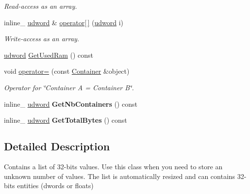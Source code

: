 \begin{DoxyCompactItemize}
\begin{DoxyCompactList}\small\item\em Read-\/access as an array. \end{DoxyCompactList}\item 
inline\+\_\+ \hyperlink{IceTypes_8h_a44c6f1920ba5551225fb534f9d1a1733}{udword} \& \hyperlink{classContainer_a8f2ac06a6c0d40eea078c108219d3cfd}{operator\mbox{[}$\,$\mbox{]}} (\hyperlink{IceTypes_8h_a44c6f1920ba5551225fb534f9d1a1733}{udword} i)\hypertarget{classContainer_a8f2ac06a6c0d40eea078c108219d3cfd}{}\label{classContainer_a8f2ac06a6c0d40eea078c108219d3cfd}

\begin{DoxyCompactList}\small\item\em Write-\/access as an array. \end{DoxyCompactList}\item 
\hyperlink{IceTypes_8h_a44c6f1920ba5551225fb534f9d1a1733}{udword} \hyperlink{classContainer_a5c3d8b367f025e179ae73aadcc620c51}{Get\+Used\+Ram} () const 
\item 
void \hyperlink{classContainer_a15a48bab360df6824d861cf3695112da}{operator=} (const \hyperlink{classContainer}{Container} \&object)\hypertarget{classContainer_a15a48bab360df6824d861cf3695112da}{}\label{classContainer_a15a48bab360df6824d861cf3695112da}

\begin{DoxyCompactList}\small\item\em Operator for \char`\"{}\+Container A = Container B\char`\"{}. \end{DoxyCompactList}\item 
inline\+\_\+ \hyperlink{IceTypes_8h_a44c6f1920ba5551225fb534f9d1a1733}{udword} {\bfseries Get\+Nb\+Containers} () const \hypertarget{classContainer_a8611d4190442ec255f7c486a2d05d8ad}{}\label{classContainer_a8611d4190442ec255f7c486a2d05d8ad}

\item 
inline\+\_\+ \hyperlink{IceTypes_8h_a44c6f1920ba5551225fb534f9d1a1733}{udword} {\bfseries Get\+Total\+Bytes} () const \hypertarget{classContainer_a225b40ce711aebc7063a93b295475d91}{}\label{classContainer_a225b40ce711aebc7063a93b295475d91}

\end{DoxyCompactItemize}


\subsection{Detailed Description}
Contains a list of 32-\/bits values. Use this class when you need to store an unknown number of values. The list is automatically resized and can contains 32-\/bits entities (dwords or floats)

